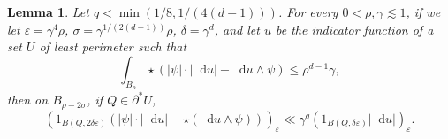 \documentclass[reqno,10pt]{amsart}
\newcommand*\dif{\mathop{}\!\mathrm{d}}
\newtheorem{lemma}[theorem]{Lemma}
\theoremstyle{definition}
\numberwithin{equation}{section}
\begin{document}
\begin{lemma}\label{mollifier sublemma}
Let $q < \min(1/8, 1/(4(d - 1)))$.
For every $0 < \rho, \gamma \lesssim 1$, if we let $\varepsilon = \gamma^4 \rho$, $\sigma = \gamma^{1/(2(d - 1))} \rho$, $\delta = \gamma^d$, and let $u$ be the indicator function of a set $U$ of least perimeter such that
\begin{equation}\label{hypothesis on mollifier sublemma}
\int_{B_\rho} \star(|\psi| \cdot |\dif u| - \dif u \wedge \psi) \leq \rho^{d - 1} \gamma,
\end{equation}
then on $B_{\rho - 2\sigma}$, if $Q \in \partial^* U$,
$$(1_{B(Q, 2\delta\varepsilon)}(|\psi| \cdot |\dif u| - \star(\dif u \wedge \psi)))_\varepsilon \ll \gamma^q (1_{B(Q, \delta\varepsilon)} |\dif u|)_\varepsilon.$$
\end{lemma}
\end{document}
